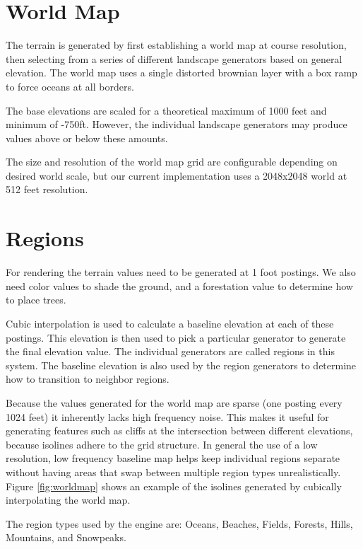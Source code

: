 \section{World Map} \label{sec:worldmap}

The terrain is generated by first establishing a world map at course resolution, then selecting from a series of different landscape generators based on general elevation.
The world map uses a single distorted brownian layer with a box ramp to force oceans at all borders.

The base elevations are scaled for a theoretical maximum of 1000 feet and minimum of -750ft.
However, the individual landscape generators may produce values above or below these amounts.

The size and resolution of the world map grid are configurable depending on desired world scale, but our current implementation uses a 2048x2048 world at 512 feet resolution.

\section{Regions} \label{sec:region}

For rendering the terrain values need to be generated at 1 foot postings.
We also need color values to shade the ground, and a forestation value to determine how to place trees.

Cubic interpolation is used to calculate a baseline elevation at each of these postings.
This elevation is then used to pick a particular generator to generate the final elevation value.
The individual generators are called regions in this system.
The baseline elevation is also used by the region generators to determine how to transition to neighbor regions.

Because the values generated for the world map are sparse (one posting every 1024 feet) it inherently lacks high frequency noise.
This makes it useful for generating features such as cliffs at the intersection between different elevations, because isolines adhere to the grid structure.
In general the use of a low resolution, low frequency baseline map helps keep individual regions separate without having areas that swap between multiple region types unrealistically.
Figure \ref{fig:worldmap} shows an example of the isolines generated by cubically interpolating the world map.

The region types used by the engine are: Oceans, Beaches, Fields, Forests, Hills, Mountains, and Snowpeaks.

